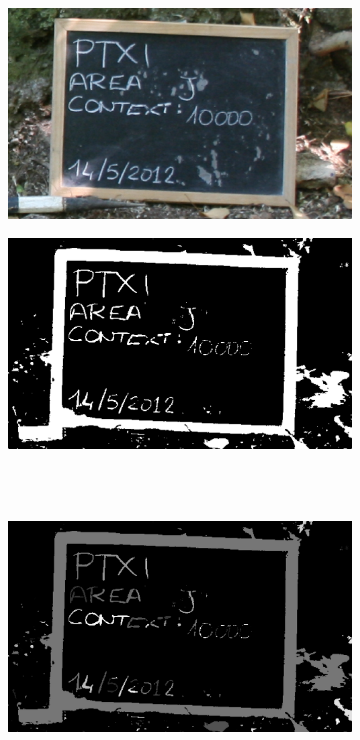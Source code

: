 \documentclass [12pt,a4paper]{report}
\begin{document}
\begin{figure}[h]
\begin{subfigure}{.5\textwidth}
  \centering
  \includegraphics[scale=0.27]{input_small.eps} %
	\caption{}
	\label{fig_input_small}  
\end{subfigure}%
\begin{subfigure}{.5\textwidth}
  \centering
  \includegraphics[scale=0.27]{thresholding_small.eps} %
	\caption{}
	\label{fig_thresholding_small}   
\end{subfigure}
\\
\\
\begin{subfigure}{.5\textwidth}
  \centering
  \includegraphics[scale=0.27]{labeling_small.eps} %

\end{subfigure}
\end{figure}
\end{document}
